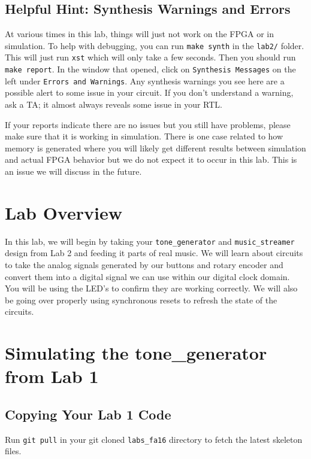 \documentclass[11pt]{article}
\begin{document}
\subsection{Helpful Hint: Synthesis Warnings and Errors}
At various times in this lab, things will just not work on the FPGA or in simulation. To help with debugging, you can run \verb|make synth| in the \verb|lab2/| folder. This will just run \verb|xst| which will only take a few seconds. Then you should run \verb|make report|. In the window that opened, click on \verb|Synthesis Messages| on the left under \verb|Errors and Warnings|. Any synthesis warnings you see here are a possible alert to some issue in your circuit. If you don't understand a warning, ask a TA; it almost always reveals some issue in your RTL.

If your reports indicate there are no issues but you still have problems, please make sure that it is working in simulation. There is one case related to how memory is generated where you will likely get different results between simulation and actual FPGA behavior but we do not expect it to occur in this lab. This is an issue we will discuss in the future. 

\section{Lab Overview}

In this lab, we will begin by taking your \verb|tone_generator| and \verb|music_streamer| design from Lab 2 and feeding it parts of real music. We will learn about circuits to take the analog signals generated by our buttons and rotary encoder and convert them into a digital signal we can use within our digital clock domain. You will be using the LED's to confirm they are working correctly. We will also be going over properly using synchronous resets to refresh the state of the circuits. 

\section{Simulating the tone\_generator from Lab 1}

\subsection{Copying Your Lab 1 Code}

Run \verb|git pull| in your git cloned \verb|labs_fa16| directory to fetch the latest skeleton files.
\end{document}
